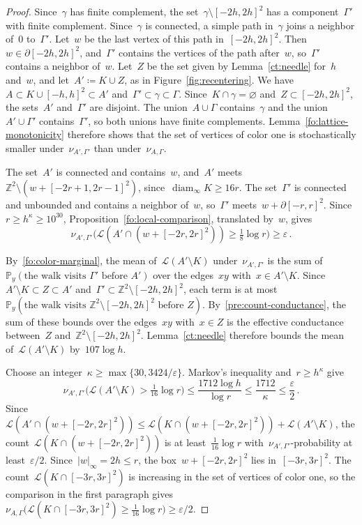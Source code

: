 \documentclass[11pt]{amsart}
\numberwithin{equation}{section}
\newcommand{\Z}{\mathbb Z}
\newcommand{\PP}{\mathbb P}
\newcommand{\cL}{\mathscr{L}}
\DeclareMathOperator{\diam}{diam}
\begin{document}
\begin{proof}
Since~$\gamma$ has finite complement, the set~$\gamma\setminus [-2h,2h]^2$ has a component~$\Gamma'$ with finite complement. Since~$\gamma$ is connected, a simple path in~$\gamma$ joins a neighbor of~$0$ to~$\Gamma'$. Let~$w$ be the last vertex of this path in~$[-2h,2h]^2$. Then~$w\in\partial[-2h,2h]^2$, and~$\Gamma'$ contains the vertices of the path after~$w$, so~$\Gamma'$ contains a neighbor of~$w$. Let~$Z$ be the set given by Lemma~\ref{ct:needle} for~$h$ and~$w$, and let~$A'\coloneqq K\cup Z$, as in Figure~\ref{fig:recentering}. We have~$A\subset K\cup [-h,h]^2\subset A'$ and~$\Gamma'\subset\gamma\subset\Gamma$. Since~$K\cap\gamma=\varnothing$ and~$Z\subset [-2h,2h]^2$, the sets~$A'$ and~$\Gamma'$ are disjoint. The union~$A\cup\Gamma$ contains~$\gamma$ and the union~$A'\cup\Gamma'$ contains~$\Gamma'$, so both unions have finite complements. Lemma~\ref{fo:lattice-monotonicity} therefore shows that the set of vertices of color one is stochastically smaller under~$\nu_{A',\Gamma'}$ than under~$\nu_{A,\Gamma}$.

The set~$A'$ is connected and contains~$w$, and~$A'$ meets~$\Z^2\setminus (w+[-2r+1,2r-1]^2)$, since~$\diam_\infty K\geq16r$. The set~$\Gamma'$ is connected and unbounded and contains a neighbor of~$w$, so~$\Gamma'$ meets~$w+\partial[-r,r]^2$. Since~$r\geq h^\kappa\geq10^{30}$, Proposition~\ref{fo:local-comparison}, translated by~$w$, gives
\begin{equation*}
\nu_{A',\Gamma'}\bigl(\cL(A'\cap (w+[-2r,2r]^2))\geq\tfrac18\log r\bigr)\geq\varepsilon\,.
\end{equation*}

By~\eqref{fo:color-marginal}, the mean of~$\cL(A'\setminus K)$ under~$\nu_{A',\Gamma'}$ is the sum of~$\PP_y(\text{the walk visits~$\Gamma'$ before~$A'$})$ over the edges~$xy$ with~$x\in A'\setminus K$. Since~$A'\setminus K\subset Z\subset A'$ and~$\Gamma'\subset\Z^2\setminus [-2h,2h]^2$, each term is at most~$\PP_y(\text{the walk visits~$\Z^2\setminus [-2h,2h]^2$ before~$Z$})$. By~\eqref{pre:count-conductance}, the sum of these bounds over the edges~$xy$ with~$x\in Z$ is the effective conductance between~$Z$ and~$\Z^2\setminus [-2h,2h]^2$. Lemma~\ref{ct:needle} therefore bounds the mean of~$\cL(A'\setminus K)$ by~$107\log h$.

Choose an integer~$\kappa\geq\max\{30,3424/\varepsilon\}$. Markov's inequality and~$r\geq h^\kappa$ give
\begin{equation*}
\nu_{A',\Gamma'}\bigl(\cL(A'\setminus K)>\tfrac1{16}\log r\bigr)\leq\frac{1712\log h}{\log r}\leq\frac{1712}\kappa\leq\frac\varepsilon2\,.
\end{equation*}
Since~$\cL(A'\cap (w+[-2r,2r]^2))\leq\cL(K\cap (w+[-2r,2r]^2))+\cL(A'\setminus K)$, the count~$\cL(K\cap (w+[-2r,2r]^2))$ is at least~$\tfrac1{16}\log r$ with~$\nu_{A',\Gamma'}$-probability at least~$\varepsilon/2$. Since~$|w|_\infty=2h\leq r$, the box~$w+[-2r,2r]^2$ lies in~$[-3r,3r]^2$. The count~$\cL(K\cap [-3r,3r]^2)$ is increasing in the set of vertices of color one, so the comparison in the first paragraph gives~$\nu_{A,\Gamma}\bigl(\cL(K\cap [-3r,3r]^2)\geq\tfrac1{16}\log r\bigr)\geq\varepsilon/2$.
\end{proof}
\end{document}
